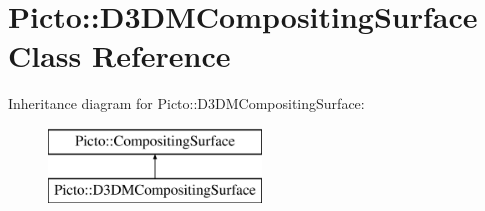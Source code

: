 \hypertarget{class_picto_1_1_d3_d_m_compositing_surface}{\section{Picto\-:\-:D3\-D\-M\-Compositing\-Surface Class Reference}
\label{class_picto_1_1_d3_d_m_compositing_surface}
}
Inheritance diagram for Picto\-:\-:D3\-D\-M\-Compositing\-Surface\-:\begin{figure}[H]
\begin{center}
\leavevmode
\includegraphics[height=2.000000cm]{class_picto_1_1_d3_d_m_compositing_surface}
\end{center}
\end{figure}
